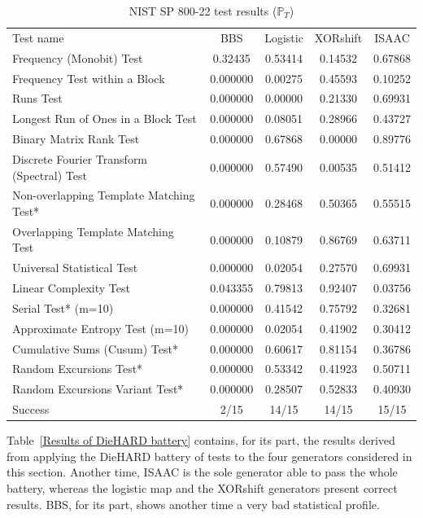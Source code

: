 \begin{table}
\renewcommand{\arraystretch}{1.3}
\caption{NIST SP 800-22 test results ($\mathbb{P}_T$)}
\label{The passing1}
\centering
\begin{tabular}{lcccc}
\toprule
Test name & BBS &Logistic& XORshift& ISAAC\\ 

Frequency (Monobit) Test 			&0.32435	&0.53414		&0.14532		&0.67868 \\ 
Frequency Test within a Block			&0.000000	&0.00275		&0.45593		&0.10252 \\ 
Runs Test 					&0.000000	&0.00000		&0.21330		&0.69931\\ 
Longest Run of Ones in a Block Test 		&0.000000	&0.08051		&0.28966		&0.43727 \\
Binary Matrix Rank Test 			&0.000000	&0.67868		&0.00000		&0.89776\\ 
Discrete Fourier Transform (Spectral) Test	&0.000000	&0.57490		&0.00535		&0.51412 \\ 
Non-overlapping Template Matching Test* 	&0.000000	&0.28468		&0.50365		&0.55515\\ 
Overlapping Template Matching Test 		&0.000000	&0.10879		&0.86769		&0.63711\\ 
Universal Statistical Test 			&0.000000	&0.02054		&0.27570		&0.69931 \\ 
Linear Complexity Test		        	&0.043355	&0.79813		&0.92407		&0.03756\\ 
Serial Test* (m=10) 				&0.000000	&0.41542		&0.75792		&0.32681 \\ 
Approximate Entropy Test (m=10) 		&0.000000	&0.02054		&0.41902		&0.30412\\ 
Cumulative Sums (Cusum) Test* 			&0.000000	&0.60617		&0.81154		&0.36786\\ 
Random Excursions Test* 			&0.000000	&0.53342		&0.41923		&0.50711 \\ 
Random Excursions Variant Test* 		&0.000000	&0.28507		&0.52833		&0.40930\\ \hline
Success 					&2/15 	&14/15		&14/15			&15/15 \\ 
\bottomrule
\end{tabular}
\end{table}

\label{Subsec:DieHARD}

Table~\ref{Results of DieHARD battery} contains, for its part, 
the results derived from applying the DieHARD battery of 
tests to the four generators considered in this section.
Another time, ISAAC is the sole generator able to pass the
whole battery, whereas the logistic map and the XORshift
generators present correct results. BBS, for its part, shows
another time a very bad statistical profile.

